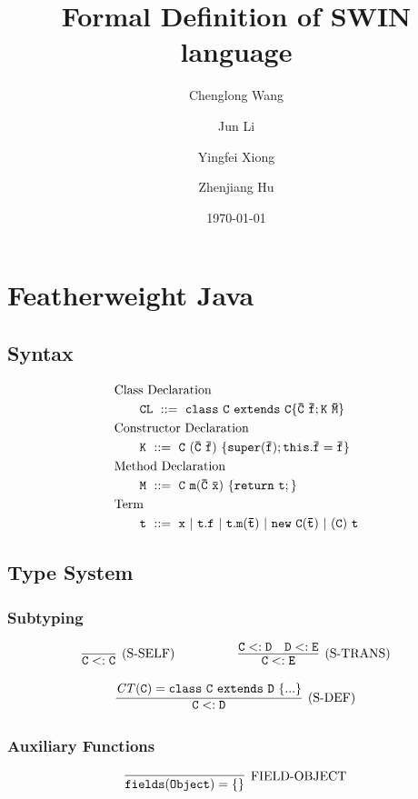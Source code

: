 \documentclass[letterpaper]{article}
\begin{document}
\title{Formal Definition of SWIN language}
\author{Chenglong Wang \and Jun Li \and Yingfei Xiong \and Zhenjiang Hu}
\date{\today}
\maketitle

\section{Featherweight Java}
\subsection{Syntax}
\begin{align*}
  & \mbox{Class Declaration}\\
  & \qquad\tt CL\ ::=\  \tt class\ C\ extends\ C \{\bar{C}\ \bar{f}; K\ \bar{M}\}\\
  & \mbox{Constructor Declaration}\\
  & \qquad\tt K \ ::=\  \tt C\ (\bar{C}\ \bar{f})\ \{ super(\bar{f}); this.\bar{f}=\bar{f}\}\\
  & \mbox{Method Declaration}\\
  & \qquad\tt M \ ::=\  \tt C\ m(\bar{C}\ \bar{x})\ \{ return\ t;\}\\
  & \mbox{Term}\\
  & \qquad\tt t \ ::=\  \tt x\ |\ t.f\ |\ t.m(\bar{t})\ |\ new\ C(\bar{t})\ |\ (C)\ t
\end{align*}
\subsection{Type System}
\subsubsection{Subtyping}
\[
\begin{array}{c c}
\infer[\text{(S-SELF)}]
  {\tt C<:C}
  {}
~~~~~~~~~~~~~~~
\infer[\text{(S-TRANS)}]
  {\tt C<:E}
  {\tt C<:D
  &\tt D<:E
  }
\end{array}
\]

\[
\begin{array}{c}

\infer[\text{(S-DEF)}]
  {\tt C<:D}
  {\tt \mathit{CT}(C)=class~C~extends~D~\{...\}
  }

\end{array}
\]

\subsubsection{Auxiliary Functions}
\[
  \begin{array}{c}
    \infer[\text{FIELD-OBJECT}]
    {\tt fields(Object)=\{\}}
    {}
  \end{array}
\]
\end{document}
